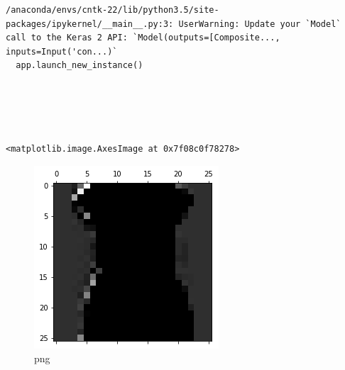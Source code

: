 \documentclass[]{book}
\theoremstyle{definition}
\theoremstyle{definition}
\theoremstyle{definition}
\theoremstyle{remark}
\begin{document}
\begin{verbatim}
/anaconda/envs/cntk-22/lib/python3.5/site-packages/ipykernel/__main__.py:3: UserWarning: Update your `Model` call to the Keras 2 API: `Model(outputs=[Composite..., inputs=Input('con...)`
  app.launch_new_instance()





<matplotlib.image.AxesImage at 0x7f08c0f78278>
\end{verbatim}

\begin{figure}
\centering
\includegraphics{output_12_2.png}
\caption{png}
\end{figure}
\end{document}

